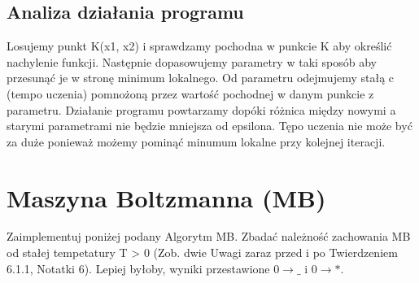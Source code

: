\documentclass[11pt]{article}
\begin{document}
\subsection{Analiza działania programu}
Losujemy punkt K(x1, x2) i sprawdzamy pochodna w punkcie K aby określić nachylenie funkcji. Następnie dopasowujemy parametry w taki sposób aby przesunąć je w stronę minimum lokalnego. Od parametru odejmujemy stałą c (tempo uczenia) pomnożoną przez wartość pochodnej w danym punkcie z parametru.
Działanie programu powtarzamy dopóki różnica między nowymi a starymi parametrami nie będzie mniejsza od epsilona. Tępo uczenia nie może być za duże ponieważ możemy pominąć minumum lokalne przy kolejnej iteracji.

\section{Maszyna Boltzmanna (MB)}
Zaimplementuj poniżej podany Algorytm MB. Zbadać należność zachowania MB od stałej
tempetatury T > 0 (Zob. dwie Uwagi zaraz przed i po Twierdzeniem 6.1.1, Notatki 6).
Lepiej byłoby, wyniki przestawione $0 \rightarrow \_$ i $0 \rightarrow *$.
\end{document}
